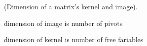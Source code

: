     
    
    
    
    

\begin{theorem}
    (Dimension of a matrix's kernel and image).

    dimension of image is number of pivots

    dimension of kernel is number of free fariables
\end{theorem}

